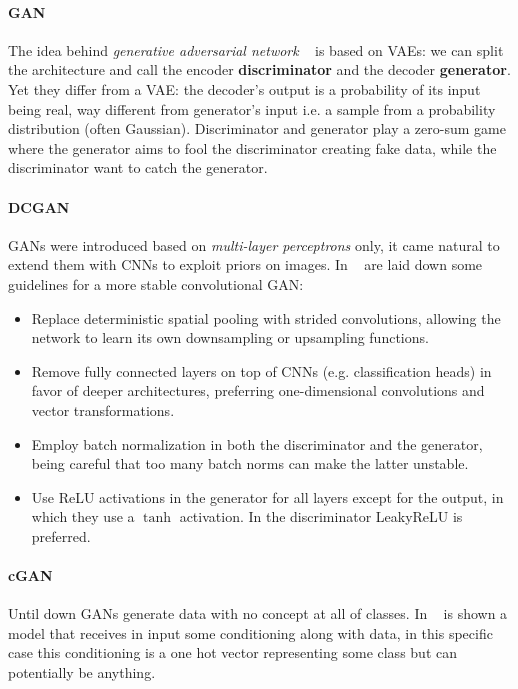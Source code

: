 \documentclass[10pt,twocolumn,letterpaper]{article}
\begin{document}
\paragraph{GAN} The idea behind \textit{generative adversarial network} ~\cite{goodfellow2014generative} is based on VAEs: we can split the architecture and call the encoder \textbf{discriminator} and the decoder \textbf{generator}.
Yet they differ from a VAE: the decoder's output is a probability of its input being real, way different from generator's input i.e. a sample from a probability distribution (often Gaussian).
Discriminator and generator play a zero-sum game where the generator aims to fool the discriminator creating fake data, while the discriminator want to catch the generator.

\paragraph{DCGAN} GANs were introduced based on \textit{multi-layer perceptrons} only, it came natural to extend them with CNNs to exploit priors on images.
In ~\cite{radford2015unsupervised} are laid down some guidelines for a more stable convolutional GAN:
\begin{itemize}
   \item Replace deterministic spatial pooling with strided convolutions, allowing the network to learn its own downsampling or upsampling functions.
   \item Remove fully connected layers on top of CNNs (e.g. classification heads) in favor of deeper architectures, preferring one-dimensional convolutions and vector transformations.
   \item Employ batch normalization in both the discriminator and the generator, being careful that too many batch norms can make the latter unstable.
   \item Use ReLU activations in the generator for all layers except for the output, in which they use a $\tanh$ activation.
         In the discriminator LeakyReLU is preferred.
\end{itemize}

\paragraph{cGAN} Until down GANs generate data with no concept at all of classes.
In ~\cite{mirza2014conditional} is shown a model that receives in input some conditioning along with data, in this specific case this conditioning is a one hot vector representing some class but can potentially be anything.
\end{document}
